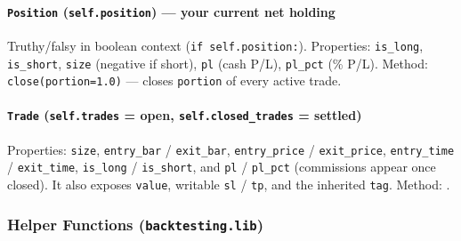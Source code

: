 \documentclass[12pt,openany]{book}
\theoremstyle{definition}
\theoremstyle{remark}
\begin{document}
\paragraph{\texttt{Position} (\texttt{self.position}) — your current net holding}

Truthy/falsy in boolean context (\texttt{if self.position:}). Properties: \texttt{is\_long}, \texttt{is\_short}, \texttt{size} (negative if short), \texttt{pl} (cash P/L), \texttt{pl\_pct} (\% P/L). Method: \texttt{close(portion=1.0)} — closes \texttt{portion} of every active trade.

\paragraph{\texttt{Trade} (\texttt{self.trades} = open, \texttt{self.closed\_trades} = settled)}

Properties: \texttt{size}, \texttt{entry\_bar} / \texttt{exit\_bar},
\texttt{entry\_price} / \texttt{exit\_price}, \texttt{entry\_time} /
\texttt{exit\_time}, \texttt{is\_long} / \texttt{is\_short}, and \texttt{pl}
/ \texttt{pl\_pct} (commissions appear once closed). It also exposes
\texttt{value}, writable \texttt{sl} / \texttt{tp}, and the inherited
\texttt{tag}. Method: .
\subsubsection{Helper Functions (\texttt{backtesting.lib})}
\end{document}
